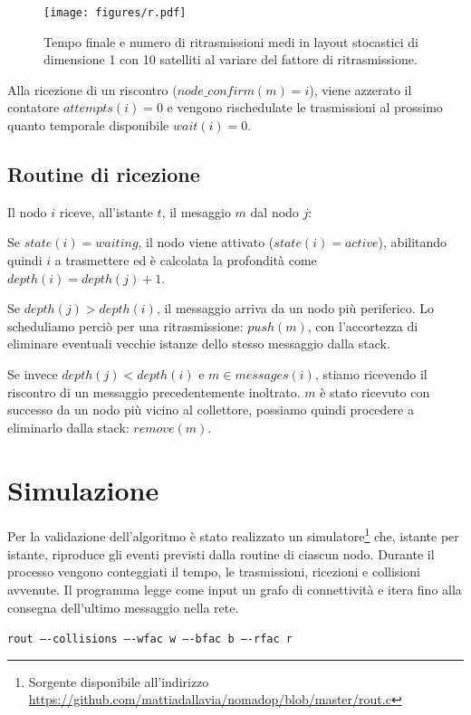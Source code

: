 \documentclass[a4paper,11pt]{article}
\theoremstyle{definition}
\begin{document}
\begin{figure}[H]
\centering
\texttt{[image: figures/r.pdf]}
\caption{Tempo finale e numero di ritrasmissioni medi in layout stocastici di dimensione 1 con 10 satelliti al variare del fattore di ritrasmissione.}
\end{figure}

Alla ricezione di un riscontro ($node\_confirm(m) = i$), viene azzerato il contatore $attempts(i) = 0$ e vengono rischedulate le trasmissioni al prossimo quanto temporale disponibile $wait(i) = 0$.

\subsection{Routine di ricezione}

Il nodo $i$ riceve, all'istante $t$, il mesaggio $m$ dal nodo $j$:

Se $state(i) = waiting$, il nodo viene attivato ($state(i) = active$), abilitando quindi $i$ a trasmettere ed è calcolata la profondità come $depth(i) = depth(j)+1$.

Se $depth(j) > depth(i)$, il messaggio arriva da un nodo più periferico. Lo scheduliamo perciò per una ritrasmissione: $push(m)$, con l'accortezza di eliminare eventuali vecchie istanze dello stesso messaggio dalla stack.

Se invece $depth(j) < depth(i)$ e $m \in messages(i)$, stiamo ricevendo il riscontro di un messaggio precedentemente inoltrato. $m$ è stato ricevuto con successo da un nodo più vicino al collettore, possiamo quindi procedere a eliminarlo dalla stack: $remove(m)$.

\section{Simulazione}
\label{simulazione}

Per la validazione dell'algoritmo è stato realizzato un simulatore\footnote{Sorgente disponibile all'indirizzo \url{https://github.com/mattiadallavia/nomadop/blob/master/rout.c}} che, istante per istante, riproduce gli eventi previsti dalla routine di ciascun nodo. Durante il processo vengono conteggiati il tempo, le trasmissioni, ricezioni e collisioni avvenute. Il programma legge come input un grafo di connettività e itera fino alla consegna dell'ultimo messaggio nella rete.

\smallskip

{\centering
\texttt{rout ----collisions ----wfac w ----bfac b ----rfac r}

}
\end{document}
